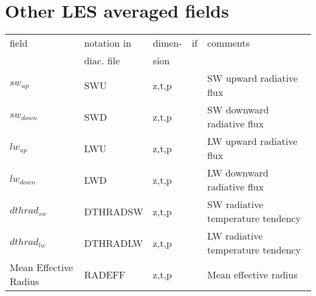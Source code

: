 \section{Other LES averaged fields}

\begin{center}
\begin{tabular}{||p{6cm}|>{\centering}p{2.5cm}|>{\centering}p{1.5cm}|>{\centering}p{0.5cm}|p{5cm }||}
\hline
\hline
field & notation in & dimen- & if    & comments \\
      & diac. file &  sion         &  & \\
\hline
\hline
$sw_{up}$ & SWU & z,t,p & & SW upward radiative flux  \\
\hline
$sw_{down}$ & SWD & z,t,p & & SW downward radiative flux  \\
\hline
$lw_{up}$ & LWU & z,t,p & & LW upward radiative flux  \\
\hline
$lw_{down}$ & LWD & z,t,p & & LW downward radiative flux  \\
\hline
$dthrad_{sw}$ & DTHRADSW & z,t,p & & SW radiative temperature tendency  \\
\hline
$dthrad_{lw}$ & DTHRADLW & z,t,p & & LW radiative temperature tendency  \\
\hline
Mean Effective Radius & RADEFF & z,t,p & & Mean effective radius  \\
\hline
\hline
\end{tabular}
\end{center}
\newpage
